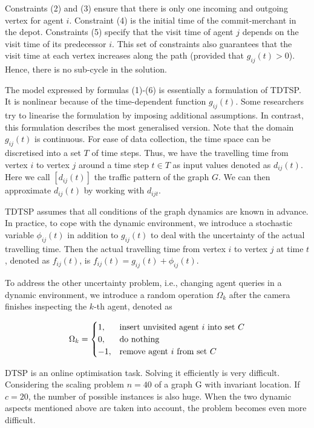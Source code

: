 Constraints (2) and (3) ensure that there is only one incoming and outgoing vertex for agent $ i $. Constraint (4) is the initial time of the commit-merchant in the depot. Constraints (5) specify that the visit time of agent $ j $ depends on the visit time of its predecessor $ i $. This set of constraints also guarantees that the visit time at each vertex increases along the path (provided that $ g_{ij}(t)>0 $). Hence, there is no sub-cycle in the solution.

The model expressed by formulas (1)-(6) is essentially a formulation of TDTSP. It is nonlinear because of the time-dependent function $ g_{ij} (t)$. Some researchers try to linearise the formulation by imposing additional assumptions. In contrast, this formulation describes the most generalised version. Note that the domain $ g_{ij}(t) $ is continuous. For ease of data collection, the time space can be discretised into a set $ T $ of time steps. Thus, we have the travelling time from vertex $ i $ to vertex $ j $ around a time step $ t \in T $ as input values denoted as $ d_{ij}(t) $. Here we call $ [d_{ij}(t)] $ the traffic pattern of the graph $ G $. We can then approximate $ d_{ij}(t) $ by working with $ d_{ijt} $.

TDTSP assumes that all conditions of the graph dynamics are known in advance. In practice, to cope with the dynamic environment, we introduce a stochastic variable $ \phi_{ij}(t) $ in addition to $ g_{ij}(t) $ to deal with the uncertainty of the actual travelling time. Then the actual travelling time from vertex $ i $ to vertex $ j $ at time $ t $, denoted as $ f_{ij}(t) $, is $ f_{ij}(t) = g_{ij}(t) + \phi_{ij}(t) $. 

To address the other uncertainty problem, i.e., changing agent queries in a dynamic environment, we introduce a random operation $ \Omega_{k} $ after the camera finishes inspecting the $ k $-th agent, denoted as

$$
\Omega_{k} = \begin{cases}
1 , & \text{insert unvisited agent $ i $ into set $ C $} \\
0 , & \text{do nothing} \\
-1 , & \text{remove agent $ i $ from set $ C $}
\end{cases}
$$

DTSP is an online optimisation task. Solving it efficiently is very difficult. Considering the scaling problem $ n = 40 $ of a graph G with invariant location. If $ c = 20 $, the number of possible instances is also huge. When the two dynamic aspects mentioned above are taken into account, the problem becomes even more difficult. 
